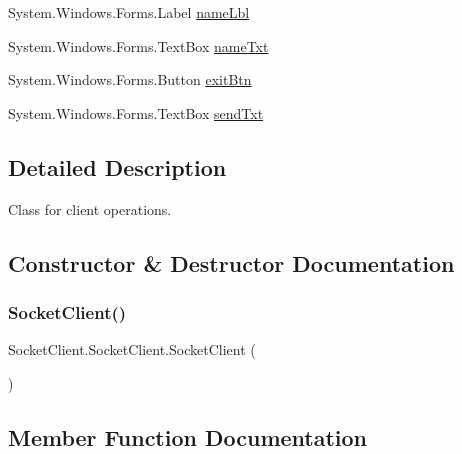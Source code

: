 \begin{DoxyCompactItemize}
\item 
System.\+Windows.\+Forms.\+Label \hyperlink{class_socket_client_1_1_socket_client_af918eefc5c4d3d78f8238ed2bde0d6b8}{name\+Lbl}
\item 
System.\+Windows.\+Forms.\+Text\+Box \hyperlink{class_socket_client_1_1_socket_client_a88b44242ed0a3716498b1dd4c6f19a39}{name\+Txt}
\item 
System.\+Windows.\+Forms.\+Button \hyperlink{class_socket_client_1_1_socket_client_a6874b1727fc1ddd55e07545e7cd6e28d}{exit\+Btn}
\item 
System.\+Windows.\+Forms.\+Text\+Box \hyperlink{class_socket_client_1_1_socket_client_ae178c12147d21c828bb8a444267289ee}{send\+Txt}
\end{DoxyCompactItemize}


\subsection{Detailed Description}
Class for client operations. 



\subsection{Constructor \& Destructor Documentation}
\mbox{\label{class_socket_client_1_1_socket_client_aa6b5f080048da540d30bfe849b1e3260}} 
\subsubsection{\texorpdfstring{Socket\+Client()}{SocketClient()}}
{\footnotesize\ttfamily Socket\+Client.\+Socket\+Client.\+Socket\+Client (\begin{DoxyParamCaption}{ }\end{DoxyParamCaption})\hspace{0.3cm}{\ttfamily [inline]}}



\subsection{Member Function Documentation}
\mbox{\label{class_socket_client_1_1_socket_client_a11f3d8e059c5212571ffa31b341db817}} 
